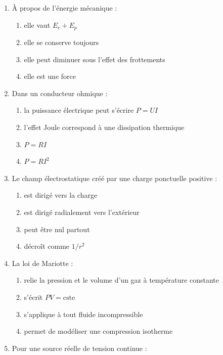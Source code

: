 \documentclass[11pt,a4paper]{article}
\begin{document}
\begin{enumerate}[label=\textbf{QCM \arabic*.},leftmargin=*]
\begin{enumerate}[label=\alph*)]
\item peut s'écrire $E_p=mgz$ à une constante près
\item est toujours nulle au sol quelle que soit la convention choisie
\item ne dépend pas du choix de la référence
\end{enumerate}
\item À propos de l'énergie mécanique :
\begin{enumerate}[label=\alph*)]
\item elle vaut $E_c+E_p$
\item elle se conserve toujours
\item elle peut diminuer sous l'effet des frottements
\item elle est une force
\end{enumerate}
\item Dans un conducteur ohmique :
\begin{enumerate}[label=\alph*)]
\item la puissance électrique peut s'écrire $P=UI$
\item l'effet Joule correspond à une dissipation thermique
\item $P=RI$
\item $P=RI^2$
\end{enumerate}
\item Le champ électrostatique créé par une charge ponctuelle positive :
\begin{enumerate}[label=\alph*)]
\item est dirigé vers la charge
\item est dirigé radialement vers l'extérieur
\item peut être nul partout
\item décroît comme $1/r^2$
\end{enumerate}
\item La loi de Mariotte :
\begin{enumerate}[label=\alph*)]
\item relie la pression et le volume d'un gaz à température constante
\item s'écrit $PV=\mathrm{cste}$
\item s'applique à tout fluide incompressible
\item permet de modéliser une compression isotherme
\end{enumerate}
\item Pour une source réelle de tension continue :
\begin{enumerate}[label=\alph*)]

\end{enumerate}
\end{enumerate}
\end{document}

